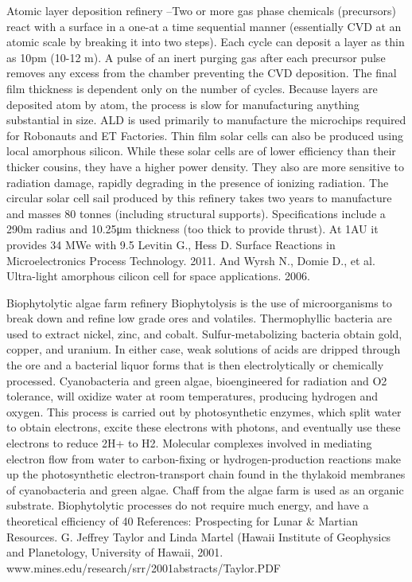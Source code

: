 \documentclass[a4paper]{book}
\begin{document}
Atomic layer deposition refinery –Two or more gas phase chemicals (precursors) react with a surface in a one-at a time sequential manner (essentially CVD at an atomic scale by breaking it into two steps).  Each cycle can deposit a layer as thin as 10pm (10-12 m). A pulse of an inert purging gas after each precursor pulse removes any excess from the chamber preventing the CVD deposition.   The final film thickness is dependent only on the number of cycles.  Because layers are deposited atom by atom, the process is slow for manufacturing anything substantial in size.  ALD is used primarily to manufacture the microchips required for Robonauts and ET Factories. Thin film solar cells can also be produced using local amorphous silicon.  While these solar cells are of lower efficiency than their thicker cousins, they have a higher power density.  They also are more sensitive to radiation damage, rapidly degrading in the presence of ionizing radiation. The circular solar cell sail produced by this refinery takes two years to manufacture and masses 80 tonnes (including structural supports). Specifications include a 290m radius and 10.25μm thickness (too thick to provide thrust).  At 1AU it provides 34 MWe with 9.5%
Levitin G., Hess D. Surface Reactions in Microelectronics Process Technology. 2011. And Wyrsh N., Domie D., et al. Ultra-light amorphous cilicon cell for space applications. 2006.
 
 
Biophytolytic algae farm refinery  Biophytolysis is the use of microorganisms to break down and refine low grade ores and volatiles. Thermophyllic bacteria are used to extract nickel, zinc, and cobalt.  Sulfur-metabolizing bacteria obtain gold, copper, and uranium.   In either case, weak solutions of acids are dripped through the ore and a bacterial liquor forms that is then electrolytically or chemically processed. Cyanobacteria and green algae, bioengineered for radiation and O2 tolerance,  will oxidize water at room temperatures, producing hydrogen and oxygen.  This process is carried out by photosynthetic enzymes, which split water to obtain electrons, excite these electrons with photons, and eventually use these electrons to reduce 2H+ to H2. Molecular complexes involved in mediating electron flow from water to carbon-fixing or hydrogen-production reactions make up the photosynthetic electron-transport chain found in the thylakoid membranes of cyanobacteria and green algae. Chaff from the algae farm is used as an organic substrate.  Biophytolytic processes do not require much energy, and have a theoretical efficiency of 40%
References: Prospecting for Lunar \& Martian Resources. G. Jeffrey Taylor and Linda Martel (Hawaii Institute of Geophysics and Planetology, University of Hawaii, 2001. www.mines.edu/research/srr/2001abstracts/Taylor.PDF
 
\end{document}
